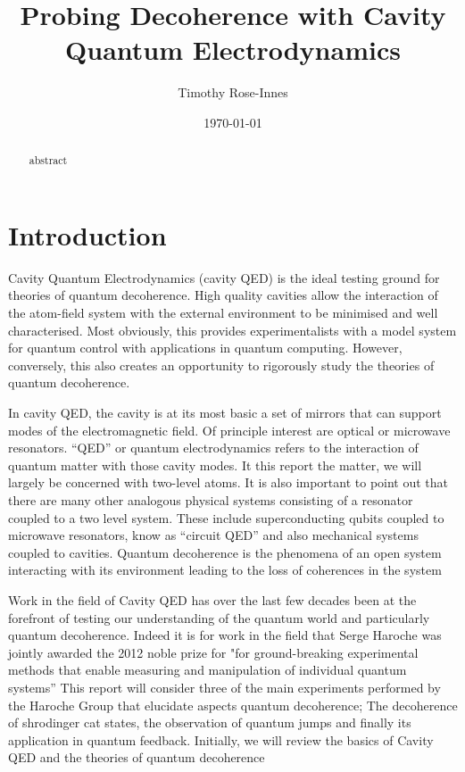 \documentclass[aps,prl,twocolumn,amsmath,amssymb]{revtex4}
\begin{document}
\title{Probing Decoherence with Cavity Quantum Electrodynamics}%
\author{Timothy Rose-Innes} %
\date{\today}%
\begin{abstract}
abstract
\end{abstract}
\maketitle

\section{\label{sec:level1}Introduction}

Cavity Quantum Electrodynamics (cavity QED) is the ideal testing ground for theories of quantum decoherence.  High quality cavities allow the interaction of the atom-field system with the external environment to be minimised and well characterised. Most obviously, this provides experimentalists with a model system for quantum control with applications in quantum computing. However, conversely, this also creates an opportunity to rigorously study the theories of quantum decoherence.
 
In cavity QED, the cavity is at its most basic a set of mirrors that can support modes of the electromagnetic field. Of principle interest are optical or microwave resonators.  “QED” or quantum electrodynamics refers to the interaction of quantum matter with those cavity modes. It this report the matter, we will largely be concerned with two-level atoms. It is also important to point out that there are many other analogous physical systems consisting of a resonator coupled to a two level system. These include superconducting qubits coupled to microwave resonators, know as “circuit QED”  and also mechanical systems coupled to cavities. Quantum decoherence is the phenomena of an open system interacting with its environment  leading to the loss of coherences in the system

Work in the field of Cavity QED has over the last few decades been at the forefront of testing our understanding of the quantum world and particularly quantum decoherence. Indeed it is for work in the field that Serge Haroche was jointly  awarded the 2012 noble prize for "for ground-breaking experimental methods that enable measuring and manipulation of individual quantum systems'' This report will consider three of the main experiments performed by the Haroche Group that elucidate aspects quantum decoherence; The decoherence of shrodinger cat states, the observation of quantum jumps and finally its application in quantum feedback. Initially, we will review the basics of Cavity QED and the theories of quantum decoherence
\end{document}
